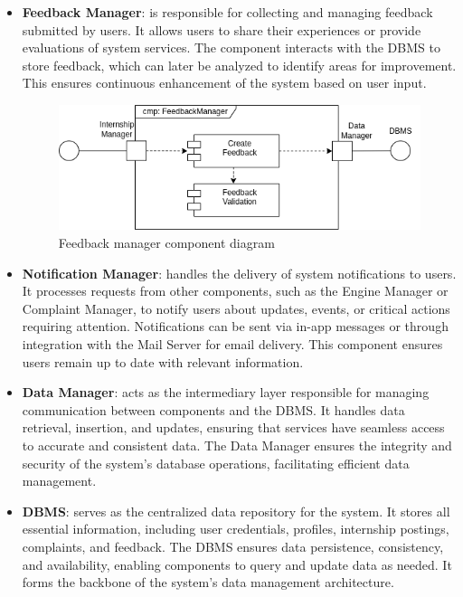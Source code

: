 \begin{itemize}
    \item \textbf{Feedback Manager}: is responsible for collecting and managing feedback submitted by users. It allows users to share their experiences or provide evaluations of system services. The component interacts with the DBMS to store feedback, which can later be analyzed to identify areas for improvement. This ensures continuous enhancement of the system based on user input.

    \begin{figure}[H]
        \centering
        \includegraphics[width=0.9\linewidth]{Images/Component diagrams/ComponentDiagram_Feedback.png}
        \caption{Feedback manager component diagram}
        \label{fig:enter-label}
    \end{figure}
    
    \item \textbf{Notification Manager}: handles the delivery of system notifications to users. It processes requests from other components, such as the Engine Manager or Complaint Manager, to notify users about updates, events, or critical actions requiring attention. Notifications can be sent via in-app messages or through integration with the Mail Server for email delivery. This component ensures users remain up to date with relevant information.
    \item \textbf{Data Manager}: acts as the intermediary layer responsible for managing communication between components and the DBMS. It handles data retrieval, insertion, and updates, ensuring that services have seamless access to accurate and consistent data. The Data Manager ensures the integrity and security of the system’s database operations, facilitating efficient data management.
    \item \textbf{DBMS}: serves as the centralized data repository for the system. It stores all essential information, including user credentials, profiles, internship postings, complaints, and feedback. The DBMS ensures data persistence, consistency, and availability, enabling components to query and update data as needed. It forms the backbone of the system's data management architecture.
\end{itemize}

